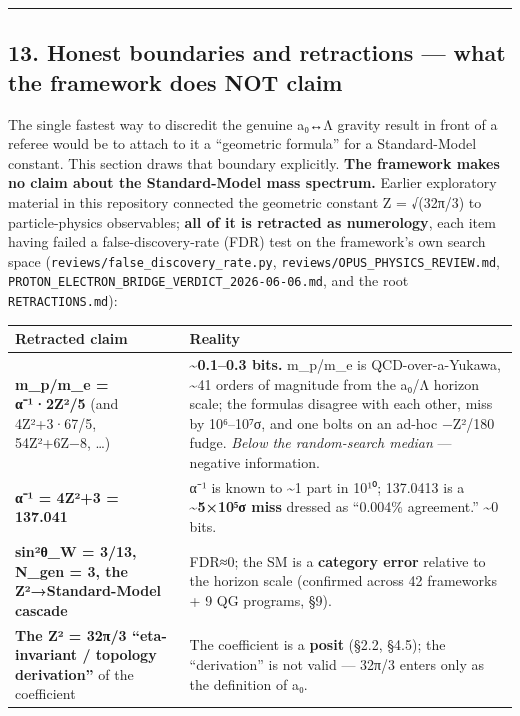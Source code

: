 \documentclass[
]{article}
\newcounter{none} %
\begin{document}
\begin{center}\rule{0.5\linewidth}{0.5pt}\end{center}

\subsection{13. Honest boundaries and retractions --- what the framework
does NOT
claim}\label{honest-boundaries-and-retractions-what-the-framework-does-not-claim}

The single fastest way to discredit the genuine a₀↔Λ gravity result in
front of a referee would be to attach to it a ``geometric formula'' for
a Standard-Model constant. This section draws that boundary explicitly.
\textbf{The framework makes no claim about the Standard-Model mass
spectrum.} Earlier exploratory material in this repository connected the
geometric constant Z = √(32π/3) to particle-physics observables;
\textbf{all of it is retracted as numerology}, each item having failed a
false-discovery-rate (FDR) test on the framework's own search space
(\texttt{reviews/false\_discovery\_rate.py},
\texttt{reviews/OPUS\_PHYSICS\_REVIEW.md},
\texttt{PROTON\_ELECTRON\_BRIDGE\_VERDICT\_2026-06-06.md}, and the root
\texttt{RETRACTIONS.md}):

{\def\LTcaptype{none} %
\begin{longtable}[]{@{}
  >{\raggedright\arraybackslash}p{}
  >{\raggedright\arraybackslash}p{}@{}}
\toprule\noalign{}
\begin{minipage}[b]{\linewidth}\raggedright
Retracted claim
\end{minipage} & \begin{minipage}[b]{\linewidth}\raggedright
Reality
\end{minipage} \\
\midrule\noalign{}
\endhead
\bottomrule\noalign{}
\endlastfoot
\textbf{m\_p/m\_e = α⁻¹·2Z²/5} (and 4Z²+3·67/5, 54Z²+6Z−8, \ldots) &
\textbf{\textasciitilde0.1--0.3 bits.} m\_p/m\_e is QCD-over-a-Yukawa,
\textasciitilde41 orders of magnitude from the a₀/Λ horizon scale; the
formulas disagree with each other, miss by 10⁶--10⁷σ, and one bolts on
an ad-hoc −Z²/180 fudge. \emph{Below the random-search median} ---
negative information. \\
\textbf{α⁻¹ = 4Z²+3 = 137.041} & α⁻¹ is known to \textasciitilde1 part
in 10¹⁰; 137.0413 is a \textbf{\textasciitilde5×10⁵σ miss} dressed as
``0.004\% agreement.'' \textasciitilde0 bits. \\
\textbf{sin²θ\_W = 3/13, N\_gen = 3, the Z²→Standard-Model cascade} &
FDR≈0; the SM is a \textbf{category error} relative to the horizon scale
(confirmed across 42 frameworks + 9 QG programs, §9). \\
\textbf{The Z² = 32π/3 ``eta-invariant / topology derivation''} of the
coefficient & The coefficient is a \textbf{posit} (§2.2, §4.5); the
``derivation'' is not valid --- 32π/3 enters only as the definition of
a₀. \\
\end{longtable}
}
\end{document}
